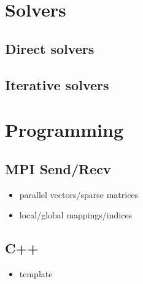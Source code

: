 \section{Solvers}
\label{sec:solvers}

\subsection{Direct solvers}
\label{sec:direct-solvers}

\begin{frame}{}
  
\end{frame}
\subsection{Iterative solvers}
\label{sec:iterative-solvers}


\begin{frame}{}
  
\end{frame}



\section{Programming}
\label{sec:programming}

\subsection{MPI Send/Recv}
\label{sec:mpi-sendrecv}

\begin{frame}{}
  \begin{itemize}
  \item parallel  vectors/sparse matrices
  \item local/global mappings/indices
    
  \end{itemize}
\end{frame}

\subsection{C++}
\label{sec:c++}

\begin{frame}{}
  \begin{itemize}
  \item template
  \end{itemize}
\end{frame}

